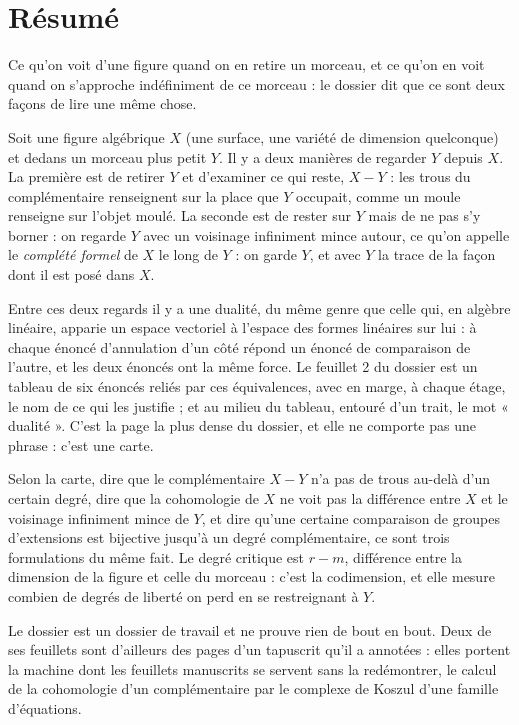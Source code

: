 \documentclass[11pt,a4paper]{article}
\begin{document}
\section*{Résumé}

\begin{resume}
Ce qu'on voit d'une figure quand on en retire un morceau, et ce qu'on en voit
quand on s'approche indéfiniment de ce morceau : le dossier dit que ce sont
deux façons de lire une même chose.

Soit une figure algébrique $X$ (une surface, une variété de dimension
quelconque) et dedans un morceau plus petit $Y$. Il y a deux manières de
regarder $Y$ depuis $X$. La première est de retirer $Y$ et d'examiner ce qui
reste, $X - Y$ : les trous du complémentaire renseignent sur la place que $Y$
occupait, comme un moule renseigne sur l'objet moulé. La seconde est de rester
sur $Y$ mais de ne pas s'y borner : on regarde $Y$ avec un voisinage
infiniment mince autour, ce qu'on appelle le \emph{complété formel} de $X$ le long de $Y$ : on garde $Y$, et avec $Y$ la trace de la façon dont il
est posé dans $X$.

Entre ces deux regards il y a une dualité, du
même genre que celle qui, en algèbre linéaire, apparie un espace vectoriel à
l'espace des formes linéaires sur lui : à chaque énoncé d'annulation d'un côté
répond un énoncé de comparaison de l'autre, et les deux énoncés ont la même force. Le feuillet 2 du dossier est un tableau de six énoncés reliés par
ces équivalences, avec en marge, à chaque étage, le nom de ce qui les
justifie ; et au milieu du tableau, entouré d'un trait, le mot « dualité ».
C'est la page la plus dense du dossier, et elle ne comporte pas une phrase :
c'est une carte.

Selon la carte, dire que le complémentaire $X - Y$ n'a pas de
trous au-delà d'un certain degré, dire que la cohomologie de $X$ ne voit pas la
différence entre $X$ et le voisinage infiniment mince de $Y$, et dire qu'une
certaine comparaison de groupes d'extensions est bijective jusqu'à un
degré complémentaire, ce sont trois formulations du même fait. Le degré
critique est $r - m$, différence entre la dimension de la figure et celle du
morceau : c'est la codimension, et elle mesure combien de degrés de liberté on
perd en se restreignant à $Y$.

Le dossier est un dossier de travail et ne prouve rien de bout en bout. Deux
de ses feuillets sont d'ailleurs des pages d'un tapuscrit qu'il a annotées :
elles portent la machine dont les feuillets manuscrits se servent sans la
redémontrer, le calcul de la cohomologie d'un complémentaire par le complexe
de Koszul d'une famille d'équations.


\end{resume}
\end{document}
